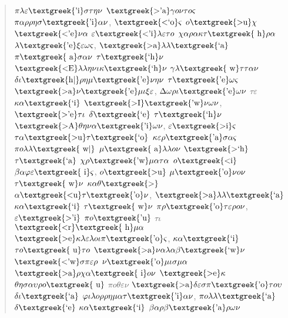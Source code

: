 \documentclass[output=paper]{langsci/langscibook}
\begin{document}
\begin{quote}
$\pi \lambda \varepsilon \text{\textgreek{'i}}\sigma \tau \eta \nu $ $\text{\textgreek{>'a}}\gamma o\nu \tau o\varsigma $ $\pi \alpha \rho \rho \eta \sigma \text{\textgreek{'i}}\alpha \nu $, $\text{\textgreek{<`o}}\varsigma $ $o\text{\textgreek{>u}}\chi $ $\text{\textgreek{<'e}}\nu \alpha $ $\varepsilon \text{\textgreek{<'i}}\lambda \varepsilon \tau o$ $\chi \alpha \rho \alpha \kappa \tau \text{\textgreek{~h}}\rho \alpha $ $\lambda \text{\textgreek{'e}}\xi \varepsilon \omega \varsigma $, $\text{\textgreek{>a}}\lambda \lambda \text{\textgreek{`a}}$ $\pi \text{\textgreek{~a}}\sigma \alpha \nu $ $\tau \text{\textgreek{`h}}\nu $ $\text{\textgreek{<E}}\lambda \lambda \eta \nu \iota \kappa \text{\textgreek{`h}}\nu $ $\gamma \lambda \text{\textgreek{~w}}\tau \tau \alpha \nu $ $\delta \iota \text{\textgreek{h|}}\rho \eta \mu \text{\textgreek{'e}}\nu \eta \nu $ $\tau \text{\textgreek{'e}}\omega \varsigma $ $\text{\textgreek{>a}}\nu \text{\textgreek{'e}}\mu \iota \xi \varepsilon $, $\Delta \omega \rho \iota \text{\textgreek{'e}}\omega \nu $ $\tau \varepsilon $ $\kappa \alpha \text{\textgreek{`i}}$ $\text{\textgreek{>I}}\text{\textgreek{'w}}\nu \omega \nu $, $\text{\textgreek{>'e}}\tau \iota $ $\delta \text{\textgreek{`e}}$ $\tau \text{\textgreek{`h}}\nu $ $\text{\textgreek{>A}}\theta \eta \nu \alpha \text{\textgreek{'i}}\omega \nu $, $\varepsilon \text{\textgreek{>i}}\varsigma $ $\tau \alpha \text{\textgreek{>u}}\tau \text{\textgreek{`o}}$ $\kappa \varepsilon \rho \text{\textgreek{'a}}\sigma \alpha \varsigma $ $\pi o\lambda \lambda \text{\textgreek{~w|}}$ $\mu \text{\textgreek{~a}}\lambda \lambda o\nu $ $\text{\textgreek{>`h}}$ $\tau \text{\textgreek{`a}}$ $\chi \rho \text{\textgreek{'w}}\mu \alpha \tau \alpha $ $o\text{\textgreek{<i}}$ $\beta \alpha \varphi \varepsilon \text{\textgreek{~i}}\varsigma $, $o\text{\textgreek{>u}}$ $\mu \text{\textgreek{'o}}\nu o\nu $ $\tau \text{\textgreek{~w}}\nu $ $\kappa \alpha \theta \text{\textgreek{>}}$ $\alpha \text{\textgreek{<u}}\tau \text{\textgreek{'o}}\nu $, $\text{\textgreek{>a}}\lambda \lambda \text{\textgreek{`a}}$ $\kappa \alpha \text{\textgreek{`i}}$ $\tau \text{\textgreek{~w}}\nu $ $\pi \rho \text{\textgreek{'o}}\tau \varepsilon \rho o\nu $, $\varepsilon \text{\textgreek{>'i}}$ $\pi o\text{\textgreek{'u}}$ $\tau \iota $ $\text{\textgreek{<r}}\text{\textgreek{~h}}\mu \alpha $ $\text{\textgreek{>e}}\kappa \lambda \varepsilon \lambda o\iota \pi \text{\textgreek{'o}}\varsigma $, $\kappa \alpha \text{\textgreek{`i}}$ $\tau o\text{\textgreek{~u}}\tau o$ $\text{\textgreek{>a}}\nu \alpha \lambda \alpha \beta \text{\textgreek{`w}}\nu $ $\text{\textgreek{<'w}}\sigma \pi \varepsilon \rho $ $\nu \text{\textgreek{'o}}\mu \iota \sigma \mu \alpha $ $\text{\textgreek{>a}}\rho \chi \alpha \text{\textgreek{~i}}o\nu $ $\text{\textgreek{>e}}\kappa $ $\theta \eta \sigma \alpha \upsilon \rho o\text{\textgreek{~u}}$ $\pi o\theta \varepsilon \nu $ $\text{\textgreek{>a}}\delta \varepsilon \sigma \pi \text{\textgreek{'o}}\tau o\upsilon $ $\delta \iota \text{\textgreek{`a}}$ $\varphi \iota \lambda o\rho \rho \eta \mu \alpha \tau \text{\textgreek{'i}}\alpha \nu $, $\pi o\lambda \lambda \text{\textgreek{`a}}$ $\delta \text{\textgreek{`e}}$ $\kappa \alpha \text{\textgreek{`i}}$ $\beta \alpha \rho \beta \text{\textgreek{'a}}\rho \omega \nu $ 
\end{quote}
\end{document}
